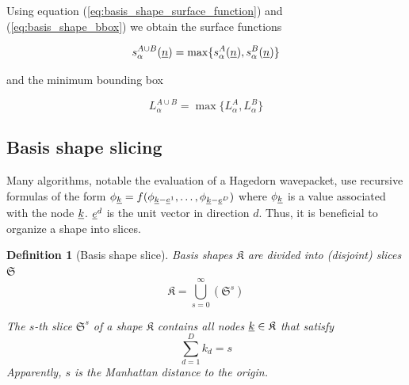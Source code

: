 \documentclass{article}
\newtheorem{definition}{Definition}
\begin{document}
Using equation (\ref{eq:basis_shape_surface_function}) and (\ref{eq:basis_shape_bbox})
we obtain the surface functions

\begin{equation}
  s_{\alpha}^{A \cup B}(\underline{n}) = \max\{s_{\alpha}^A(\underline{n}), s_{\alpha}^B(\underline{n})\}
\end{equation}

and the minimum bounding box

\begin{equation}
  L_{\alpha}^{A \cup B} = \max\{L_{\alpha}^{A}, L_{\alpha}^{B}\}
\end{equation}

\subsection{Basis shape slicing} \label{sec:basis_shape_slice}
Many algorithms, notable the evaluation of a Hagedorn wavepacket,
use recursive formulas of the form
\( \phi_{\underline{k}} = f(\phi_{\underline{k}-\underline{e}^1}, \ldots,
\phi_{\underline{k}-\underline{e}^D}) \)
where \( \phi_{\underline{k}} \)
is a value associated with the node \( \underline{k} \).
\( \underline{e}^d \) is the unit vector in direction \( d \).
Thus, it is beneficial to organize a shape into slices.

\begin{definition}[Basis shape slice]
  \label{eq:basis_shape_slice}
  Basis shapes \(\mathfrak{K}\) are divided into (disjoint) slices \(\mathfrak{S}\)
  \begin{equation}
    \mathfrak{K}=\bigcup_{s=0}^{\infty} \left(\mathfrak{S}^s\right)
  \end{equation}
  
  The \( s \)-th
  slice \( \mathfrak{S}^s \) of a shape \( \mathfrak{K} \)
  contains all nodes \( \underline{k} \in \mathfrak{K} \)
  that satisfy
  \begin{equation}
    \sum_{d=1}^{D} k_d = s
  \end{equation}
  Apparently, \(s\) is the Manhattan distance to the origin.
\end{definition}
\end{document}
